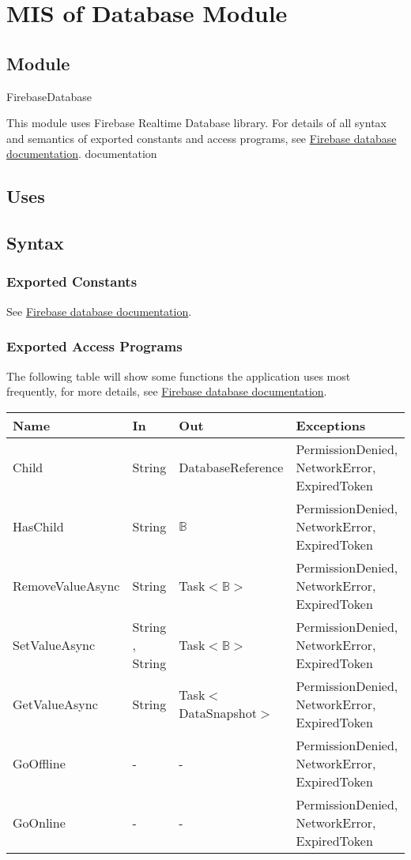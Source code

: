 \documentclass[12pt, titlepage]{article}
\begin{document}
\section{MIS of Database Module} \label{mDB}

\subsection{Module}

FirebaseDatabase

\noindent This module uses Firebase Realtime Database library. For details of all syntax and semantics of exported constants and access programs, see \href{https://firebase.google.com/docs/reference/unity/namespace/firebase/database}{Firebase database documentation}.
documentation
\subsection{Uses}

\subsection{Syntax}

\subsubsection{Exported Constants}
See \href{https://firebase.google.com/docs/reference/unity/namespace/firebase/database}{Firebase database documentation}.
\subsubsection{Exported Access Programs}
The following table will show some functions the application uses most frequently, for more details, see \href{https://firebase.google.com/docs/reference/unity/namespace/firebase/database}{Firebase database documentation}.
\begin{center}
\begin{tabular}{p{4cm} p{2cm} p{4cm} p{4cm}}
\hline
\textbf{Name} & \textbf{In} & \textbf{Out} & \textbf{Exceptions} \\
\hline
Child & String & DatabaseReference & PermissionDenied, NetworkError, ExpiredToken \\
HasChild & String & $\mathbb{B}$ & PermissionDenied, NetworkError, ExpiredToken \\
RemoveValueAsync & String & Task$<\mathbb{B}>$ & PermissionDenied,  NetworkError,  ExpiredToken \\
SetValueAsync & String , String & Task$<\mathbb{B}>$ & PermissionDenied,  NetworkError,  ExpiredToken \\
GetValueAsync & String & Task$<$DataSnapshot$>$ & PermissionDenied, NetworkError,  ExpiredToken \\
GoOffline & - & - & PermissionDenied, NetworkError,  ExpiredToken \\
GoOnline & - & - & PermissionDenied, NetworkError,  ExpiredToken \\
\hline
\end{tabular}
\end{center}
\end{document}

